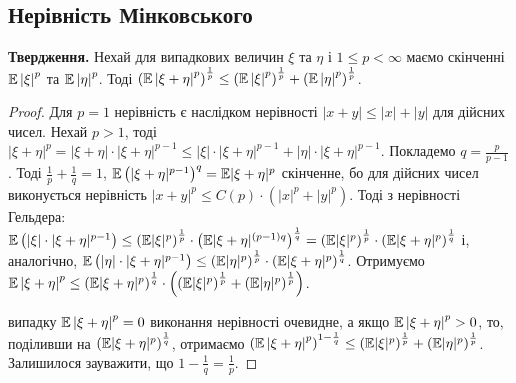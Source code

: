 \subsection{Нерівність Мінковського}
\noindent\textbf{Твердження.} Нехай для випадкових величин $\xi$ та $\eta$ і $1\leq p < \infty$ маємо скінченні
$\mathbb{E}\left| \xi\right|^p$ та $\mathbb{E}\left| \eta\right|^p$. Тоді
$\left(\mathbb{E}\left| \xi + \eta\right|^p\right)^{\frac{1}{p}} \leq \left(\mathbb{E}\left| \xi \right|^p\right)^{\frac{1}{p}}
+\left(\mathbb{E}\left| \eta \right|^p\right)^{\frac{1}{p}}$.
\begin{proof}
    Для $p=1$ нерівність є наслідком нерівності $\left| x+y\right| \leq |x| + |y|$ для дійсних чисел.
    Нехай $p > 1$, тоді $\left| \xi + \eta\right|^p = |\xi + \eta| \cdot |\xi + \eta|^{p-1} \leq |\xi| \cdot |\xi + \eta|^{p-1} +
    |\eta| \cdot |\xi + \eta|^{p-1}$.
    Покладемо $q = \frac{p}{p-1}$. Тоді $\frac{1}{p} + \frac{1}{q} = 1$, $\mathbb{E}\left(|\xi + \eta|^{p-1} \right)^{q} = \mathbb{E}|\xi+ \eta|^p$ скінченне, бо 
    для дійсних чисел виконується нерівність $|x+y|^p \leq C(p) \cdot (|x|^p + |y|^p)$.
    Тоді з нерівності Гельдера: $\mathbb{E}\left( |\xi|\cdot |\xi + \eta|^{p-1}\right) \leq
    \left( \mathbb{E}|\xi|^p\right)^{\frac{1}{p}} \cdot \left( \mathbb{E} |\xi + \eta|^{(p-1)q}\right)^{\frac{1}{q}} = 
    \left( \mathbb{E}|\xi|^p\right)^{\frac{1}{p}} \cdot \left( \mathbb{E} |\xi + \eta|^{p}\right)^{\frac{1}{q}}$ і,
    аналогічно, 
    $\mathbb{E}\left( |\eta|\cdot |\xi + \eta|^{p-1}\right) \leq 
    \left( \mathbb{E}|\eta|^p\right)^{\frac{1}{p}} \cdot \left( \mathbb{E} |\xi + \eta|^{p}\right)^{\frac{1}{q}}$.
    Отримуємо $\mathbb{E}\left| \xi + \eta\right|^p \leq \left( \mathbb{E} |\xi + \eta|^{p}\right)^{\frac{1}{q}} \cdot 
    \left(\left(\mathbb{E}|\xi|^p\right)^{\frac{1}{p}} + \left(\mathbb{E}|\eta|^p\right)^{\frac{1}{p}}\right)$.
    
     випадку $\mathbb{E}\left| \xi + \eta\right|^p = 0$ виконання нерівності очевидне, а якщо $\mathbb{E}\left| \xi + \eta\right|^p > 0$, то, поділивши на 
    $\left( \mathbb{E} |\xi + \eta|^{p}\right)^{\frac{1}{q}}$, отримаємо
    $\left(\mathbb{E}\left| \xi + \eta\right|^p\right)^{1 - \frac{1}{q}} \leq  
    \left(\mathbb{E}|\xi|^p\right)^{\frac{1}{p}} + \left(\mathbb{E}|\eta|^p\right)^{\frac{1}{p}}$.
    Залишилося зауважити, що $1 - \frac{1}{q} = \frac{1}{p}$.
\end{proof}